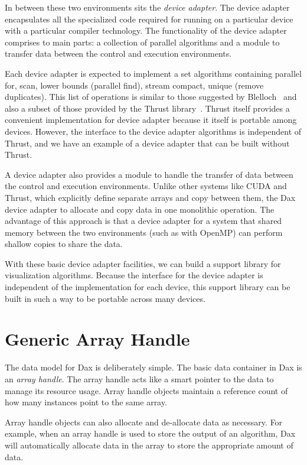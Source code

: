 \documentclass[conference]{IEEEtran}
\newcommand*{\lcite}[1]{~\cite{#1}}
\newcommand*{\scite}[1]{~\cite{#1}}
\newcommand*{\keyterm}[1]{\emph{#1}}
\begin{document}
In between these two environments sits the \keyterm{device adapter}.  The
device adapter encapsulates all the specialized code required for running
on a particular device with a particular compiler technology.  The
functionality of the device adapter comprises to main parts: a collection
of parallel algorithms and a module to transfer data between the control
and execution environments.

Each device adapter is expected to implement a set algorithms containing
parallel for, scan, lower bounds (parallel find), stream compact, unique
(remove duplicates).  This list of operations is similar to those suggested
by Blelloch\scite{Blelloch1990} and also a subset of those provided by the
Thrust library\lcite{Thrust}.  Thrust itself provides a convenient
implementation for device adapter because it itself is portable among
devices.  However, the interface to the device adapter algorithms is
independent of Thrust, and we have an example of a device adapter that can
be built without Thrust.

A device adapter also provides a module to handle the transfer of data
between the control and execution environments.  Unlike other systems like
CUDA and Thrust, which explicitly define separate arrays and copy between
them, the Dax device adapter to allocate and copy data in one monolithic
operation.  The advantage of this approach is that a device adapter for a
system that shared memory between the two environments (such as with
OpenMP) can perform shallow copies to share the data.

With these basic device adapter facilities, we can build a support library
for visualization algorithms.  Because the interface for the device adapter
is independent of the implementation for each device, this support library
can be built in such a way to be portable across many devices.

\section{Generic Array Handle}
\label{sec:GenericArrayHandle}

\noindent
The data model for Dax is deliberately simple.  The basic data container in
Dax is an \keyterm{array handle}.  The array handle acts like a smart
pointer to the data to manage its resource usage.  Array handle objects
maintain a reference count of how many instances point to the same array.

Array handle objects can also allocate and de-allocate data as necessary.
For example, when an array handle is used to store the output of an
algorithm, Dax will automatically allocate data in the array to store the
appropriate amount of data.
\end{document}

